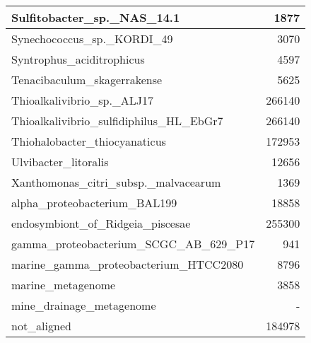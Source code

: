 \documentclass[12pt,a4paper]{article}
\begin{document}
\begin{table}[ht]
\begin{center}
\begin{tabular}{|l*{1}{|r}|}
Sulfitobacter\_sp.\_NAS\_14.1 & 1877 \\ \hline
Synechococcus\_sp.\_KORDI\_49 & 3070 \\ \hline
Syntrophus\_aciditrophicus & 4597 \\ \hline
Tenacibaculum\_skagerrakense & 5625 \\ \hline
Thioalkalivibrio\_sp.\_ALJ17 & 266140 \\ \hline
Thioalkalivibrio\_sulfidiphilus\_HL\_EbGr7 & 266140 \\ \hline
Thiohalobacter\_thiocyanaticus & 172953 \\ \hline
Ulvibacter\_litoralis & 12656 \\ \hline
Xanthomonas\_citri\_subsp.\_malvacearum & 1369 \\ \hline
alpha\_proteobacterium\_BAL199 & 18858 \\ \hline
endosymbiont\_of\_Ridgeia\_piscesae & 255300 \\ \hline
gamma\_proteobacterium\_SCGC\_AB\_629\_P17 & 941 \\ \hline
marine\_gamma\_proteobacterium\_HTCC2080 & 8796 \\ \hline
marine\_metagenome & 3858 \\ \hline
mine\_drainage\_metagenome & - \\ \hline
not\_aligned & 184978 \\ \hline
\end{tabular}
\end{center}
\end{table}
\end{document}
